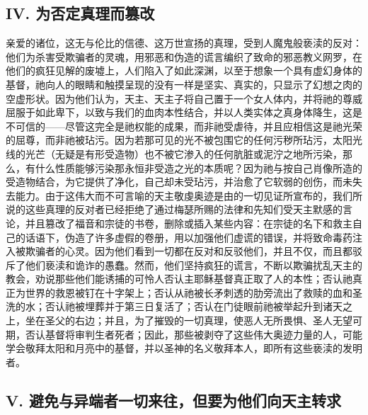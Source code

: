 
\subsection{IV. 为否定真理而篡改}

亲爱的诸位，这无与伦比的信德、这万世宣扬的真理，受到人魔鬼般亵渎的反对：他们为杀害受欺骗者的灵魂，用邪恶和伪造的谎言编织了致命的邪恶教义网罗，在他们的疯狂见解的废墟上，人们陷入了如此深渊，以至于想象一个具有虚幻身体的基督，祂向人的眼睛和触摸呈现的没有一样是坚实、真实的，只显示了幻想之肉的空虚形状。因为他们认为，天主、天主子将自己置于一个女人体内，并将祂的尊威屈服于如此卑下，以致与我们的血肉本性结合，并以人类实体之真身体降生，这是不可信的——尽管这完全是祂权能的成果，而非祂受虐待，并且应相信这是祂光荣的屈尊，而非祂被玷污。因为若那可见的光不被包围它的任何污秽所玷污，太阳光线的光芒（无疑是有形受造物）也不被它渗入的任何肮脏或泥泞之地所污染，那么，有什么性质能够污染那永恒非受造之光的本质呢？因为祂与按自己肖像所造的受造物结合，为它提供了净化，自己却未受玷污，并治愈了它软弱的创伤，而未失去能力。由于这伟大而不可言喻的天主敬虔奥迹是由的一切见证所宣布的，我们所说的这些真理的反对者已经拒绝了通过梅瑟所赐的法律和先知们受天主默感的言论，并且篡改了福音和宗徒的书卷，删除或插入某些内容：在宗徒的名下和救主自己的话语下，伪造了许多虚假的卷册，用以加强他们虚谎的错误，并将致命毒药注入被欺骗者的心灵。因为他们看到一切都在反对和反驳他们，并且不仅，而且都驳斥了他们亵渎和诡诈的愚蠢。然而，他们坚持疯狂的谎言，不断以欺骗扰乱天主的教会，劝说那些他们能诱捕的可怜人否认主耶稣基督真正取了人的本性；否认祂真正为世界的救恩被钉在十字架上；否认从祂被长矛刺透的肋旁流出了救赎的血和圣洗的水；否认祂被埋葬并于第三日复活了；否认在门徒眼前祂被举起升到诸天之上，坐在圣父的右边；并且，为了摧毁的一切真理，使恶人无所畏惧、圣人无望可期，否认基督将审判生者死者；因此，那些被剥夺了这些伟大奥迹力量的人，可能学会敬拜太阳和月亮中的基督，并以圣神的名义敬拜本人，即所有这些亵渎的发明者。\par


\subsection{V. 避免与异端者一切来往，但要为他们向天主转求}

